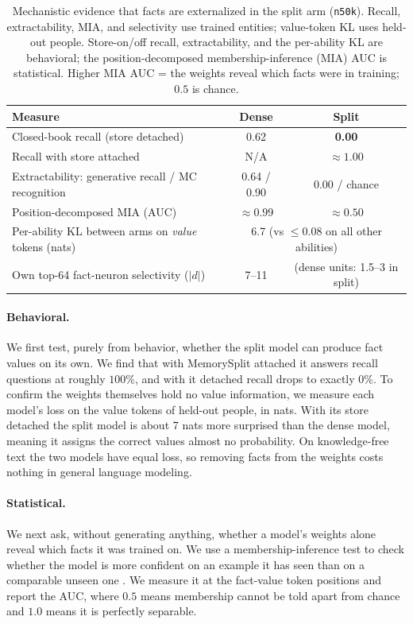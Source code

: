 \documentclass{article}
\begin{document}
\begin{table}[!htbp]
\centering
\small
\caption{Mechanistic evidence that facts are externalized in the split arm (\texttt{n50k}). Recall, extractability, MIA, and selectivity use trained entities; value-token KL uses held-out people. Store-on/off recall, extractability, and the per-ability KL are behavioral; the position-decomposed membership-inference (MIA) AUC is statistical. Higher MIA AUC = the weights reveal which facts were in training; $0.5$ is chance.}
\label{tab:mech_evidence}
\begin{tabular}{lcc}
\toprule Measure & Dense & Split \\
\midrule Closed-book recall (store detached) & 0.62 & \textbf{0.00} \\
Recall with store attached & N/A & \textbf{$\approx 1.00$} \\
Extractability: generative recall / MC recognition & 0.64 / 0.90 & 0.00 / chance \\
Position-decomposed MIA (AUC) & $\approx 0.99$ & \textbf{$\approx 0.50$} \\
Per-ability KL between arms on \emph{value} tokens (nats) & \multicolumn{2}{c}{6.7 \; (vs $\leq$0.08 on all other abilities)} \\
Own top-64 fact-neuron selectivity ($|d|$) & 7--11 & (dense units: 1.5--3 in split) \\
\bottomrule
\end{tabular}
\end{table}

\paragraph{Behavioral.} We first test, purely from behavior, whether the split model can produce fact values on its own. We find that with MemorySplit attached it answers recall questions at roughly $100\%$, and with it detached recall drops to exactly $0\%$. To confirm the weights themselves hold no value information, we measure each model's loss on the value tokens of held-out people, in nats. With its store detached the split model is about $7$ nats more surprised than the dense model, meaning it assigns the correct values almost no probability. On knowledge-free text the two models have equal loss, so removing facts from the weights costs nothing in general language modeling. 

\paragraph{Statistical.} We next ask, without generating anything, whether a model's weights alone reveal which facts it was trained on. We use a membership-inference test to check whether the model is more confident on an example it has seen than on a comparable unseen one \citep{shokri2017membership,carlini2022lira}. We measure it at the fact-value token positions and report the AUC, where $0.5$ means membership cannot be told apart from chance and $1.0$ means it is perfectly separable. 
\end{document}
